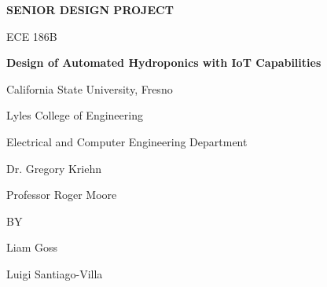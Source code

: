 \documentclass[12pt]{article}
\begin{document}
\begin{titlepage}
    \centering
    {\Large\bfseries SENIOR DESIGN PROJECT\par}
    \vspace{1.5cm}
    {\Large ECE 186B\par}
    \vspace{1.5cm}
    {\Large\bfseries Design of Automated Hydroponics with IoT Capabilities\par}
    \vspace{3cm}
    {\large California State University, Fresno\par}
    {\large Lyles College of Engineering\par}
    {\large Electrical and Computer Engineering Department\par}
    \vspace{2cm}
    {\large Dr. Gregory Kriehn\par}
    {\large Professor Roger Moore\par}
    \vspace{2cm}
    {\large BY\par}
    \vspace{1cm}
    {\large Liam Goss\par}
    {\large Luigi Santiago-Villa\par}
\end{titlepage}
\end{document}
